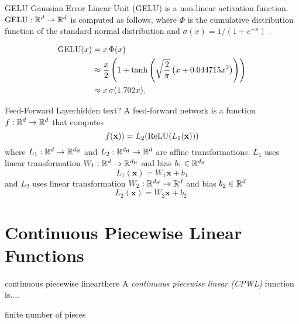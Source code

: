 \begin{definition}{GELU}{}
    Gaussian Error Linear Unit (GELU) is a non-linear activation function. $\text{GELU} : \mathbb{R}^d\to \mathbb{R}^d$ is computed as follows, where $\Phi$ is the cumulative distribution function of the standard normal distribution and $\sigma(x) = 1/(1+e^{-x})$ \cite{hendrycks2023}.

    \begin{align}
        \text{GELU}(x) &= x\,\Phi(x) \\
        &\approx \frac{x}{2} \left(1 + \tanh\left(\sqrt{\frac{2}{\pi}} \left(x + 0.044715x^3\right)\right)\right) \\
        &\approx x\,\sigma(1.702 x).
    \label{eq:gelu}
    \end{align}
\end{definition}

\begin{definition}{Feed-Forward Layer}{hidden text?}
    A feed-forward network is a function $f:\mathbb{R}^d\to \mathbb{R}^d$ that computes
    \[f(\mathbf{x})) = L_2(\text{ReLU}(L_1(\mathbf{x})))\]
    where $L_1: \mathbb{R}^d \to \mathbb{R}^{d_{\text{ff}}}$ and $L_2: \mathbb{R}^{d_{\text{ff}}} \to \mathbb{R}^{d}$ are affine transformations. $L_1$ uses linear transformation $W_1:\mathbb{R}^d\to \mathbb{R}^{d_{\text{ff}}}$ and bias $b_1\in\mathbb{R}^{d_{\text{ff}}}$
    \[L_1(\mathbf{x}) = W_1 \mathbf{x} + b_1\]
    and $L_2$ uses linear transformation $W_2:\mathbb{R}^{d_{\text{ff}}}\to \mathbb{R}^d$ and bias $b_2\in\mathbb{R}^{d}$
    \[L_2(\mathbf{x}) = W_2 \mathbf{x} + b_2.\]
\end{definition}

\section{Continuous Piecewise Linear Functions}

\begin{definition}{continuous piecewise linear}{there}
A \emph{continuous piecewise linear (CPWL)} function is....

finite number of pieces
\end{definition}

